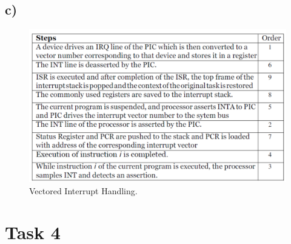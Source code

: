 \documentclass[10pt,a4paper]{article}
\begin{document}
\subsection*{c)}
\begin{figure}[h]
\includegraphics[width=\linewidth]{3c.pdf}
\caption{Vectored Interrupt Handling.} 
\label{fig:1c}
\end{figure}
\newpage

\section*{Task 4}
\end{document}

